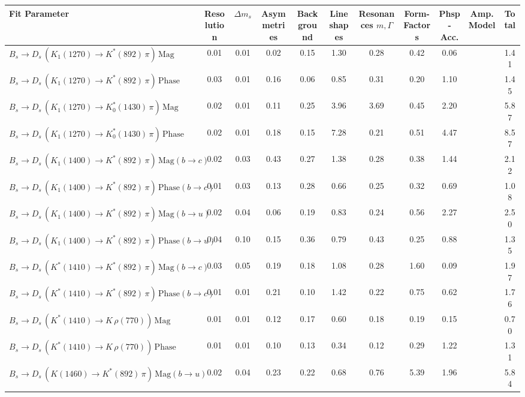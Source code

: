 \begin{tabular}{l  c  c  c  c  c  c  c  c  c  | c }
\hline
\hline
Fit Parameter & Resolution & $\Delta m_{s}$ & Asymmetries & Background & Lineshapes & Resonances $m, \Gamma$ & Form-Factors & Phsp-Acc. & Amp. Model &  Total  \\ 
\hline
$B_s \to D_s \, ( K_1(1270) \to K^{*}(892) \, \pi ) \, \text{Mag}$ & 0.01 & 0.01 & 0.02 & 0.15 & 1.30 & 0.28 & 0.42 & 0.06 &  & 1.41 \\ 
$B_s \to D_s \, ( K_1(1270) \to K^{*}(892) \, \pi ) \, \text{Phase}$ & 0.03 & 0.01 & 0.16 & 0.06 & 0.85 & 0.31 & 0.20 & 1.10 &  & 1.45 \\ 
$B_s \to D_s \, ( K_1(1270) \to K^{*}_{0}(1430) \, \pi ) \, \text{Mag} $ & 0.02 & 0.01 & 0.11 & 0.25 & 3.96 & 3.69 & 0.45 & 2.20 &  & 5.87 \\ 
$B_s \to D_s \, ( K_1(1270) \to K^{*}_{0}(1430) \, \pi ) \, \text{Phase} $ & 0.02 & 0.01 & 0.18 & 0.15 & 7.28 & 0.21 & 0.51 & 4.47 &  & 8.57 \\ 
$B_s \to D_s \, ( K_1(1400) \to K^{*}(892) \, \pi ) \, \text{Mag} (b \to c)$ & 0.02 & 0.03 & 0.43 & 0.27 & 1.38 & 0.28 & 0.38 & 1.44 &  & 2.12 \\ 
$B_s \to D_s \, ( K_1(1400) \to K^{*}(892) \, \pi ) \, \text{Phase} (b \to c)$ & 0.01 & 0.03 & 0.13 & 0.28 & 0.66 & 0.25 & 0.32 & 0.69 &  & 1.08 \\ 
$B_s \to D_s \, ( K_1(1400) \to K^{*}(892) \, \pi ) \, \text{Mag} (b \to u)$ & 0.02 & 0.04 & 0.06 & 0.19 & 0.83 & 0.24 & 0.56 & 2.27 &  & 2.50 \\ 
$B_s \to D_s \, ( K_1(1400) \to K^{*}(892) \, \pi ) \, \text{Phase} (b \to u)$ & 0.04 & 0.10 & 0.15 & 0.36 & 0.79 & 0.43 & 0.25 & 0.88 &  & 1.35 \\ 
$B_s \to D_s \, ( K^{*}(1410) \to K^{*}(892) \, \pi ) \, \text{Mag} (b \to c)$ & 0.03 & 0.05 & 0.19 & 0.18 & 1.08 & 0.28 & 1.60 & 0.09 &  & 1.97 \\ 
$B_s \to D_s \, ( K^{*}(1410) \to K^{*}(892) \, \pi ) \, \text{Phase} (b \to c)$ & 0.01 & 0.01 & 0.21 & 0.10 & 1.42 & 0.22 & 0.75 & 0.62 &  & 1.76 \\ 
$B_s \to D_s \, ( K^{*}(1410) \to K \, \rho(770) ) \, \text{Mag}$ & 0.01 & 0.01 & 0.12 & 0.17 & 0.60 & 0.18 & 0.19 & 0.15 &  & 0.70 \\ 
$B_s \to D_s \, ( K^{*}(1410) \to K \, \rho(770) ) \, \text{Phase}$ & 0.01 & 0.01 & 0.10 & 0.13 & 0.34 & 0.12 & 0.29 & 1.22 &  & 1.31 \\ 
$B_s \to D_s \, ( K(1460) \to K^{*}(892) \, \pi ) \, \text{Mag} (b \to u)$ & 0.02 & 0.04 & 0.23 & 0.22 & 0.68 & 0.76 & 5.39 & 1.96 &  & 5.84 \\ 

\end{tabular}
